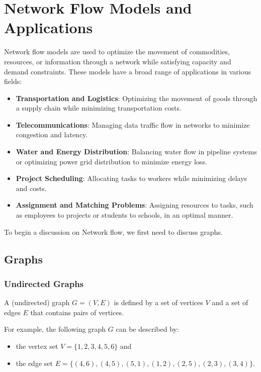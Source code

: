 
\section{Network Flow Models and Applications}
\label{sec:network-flow-models}

Network flow models are used to optimize the movement of commodities, resources, or information through a network while satisfying capacity and demand constraints. These models have a broad range of applications in various fields:

\begin{itemize}
    \item \textbf{Transportation and Logistics}: Optimizing the movement of goods through a supply chain while minimizing transportation costs.
    \item \textbf{Telecommunications}: Managing data traffic flow in networks to minimize congestion and latency.
    \item \textbf{Water and Energy Distribution}: Balancing water flow in pipeline systems or optimizing power grid distribution to minimize energy loss.
    \item \textbf{Project Scheduling}: Allocating tasks to workers while minimizing delays and costs.
    \item \textbf{Assignment and Matching Problems}: Assigning resources to tasks, such as employees to projects or students to schools, in an optimal manner.
\end{itemize}

To begin a discussion on Network flow, we first need to discuss graphs.   

\subsection{Graphs}

\subsubsection{Undirected Graphs}
\begin{definition}{}
A (undirected) graph $G = (V,E)$ is defined by a set of vertices $V$ and a set of edges $E$ that contains pairs of vertices. 
\end{definition}

For example, the following graph $G$ can be described by:
\begin{itemize}
\item the vertex set $V = \{1,2,3,4,5,6\}$ and 
\item the edge set $E = \{(4,6),(4,5), (5,1), (1,2), (2,5), (2,3), (3,4)\}$.
\end{itemize}

